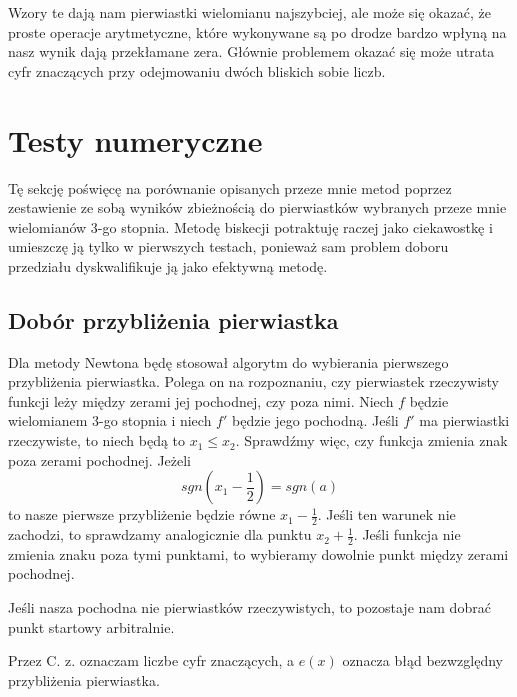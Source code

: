 \documentclass[a4paper]{article}
\begin{document}
    Wzory te dają nam pierwiastki wielomianu najszybciej, ale może się okazać, że proste operacje arytmetyczne,
    które wykonywane są po drodze bardzo wpłyną na nasz wynik dają przekłamane zera. Głównie problemem okazać się 
    może utrata cyfr znaczących przy odejmowaniu dwóch bliskich sobie liczb.

\newpage
\section{Testy numeryczne}
    Tę sekcję poświęcę na porównanie opisanych przeze mnie metod poprzez zestawienie ze sobą wyników zbieżnością
    do pierwiastków wybranych przeze mnie wielomianów 3-go stopnia. Metodę biskecji potraktuję raczej jako ciekawostkę
    i umieszczę ją tylko w pierwszych testach, ponieważ sam problem doboru przedziału dyskwalifikuje ją jako 
    efektywną metodę.

    \vspace{5mm}

    \subsection{Dobór przybliżenia pierwiastka}
    Dla metody Newtona będę stosował algorytm do wybierania pierwszego przybliżenia pierwiastka. Polega 
    on na rozpoznaniu, czy pierwiastek rzeczywisty funkcji leży między zerami jej pochodnej, czy poza nimi. Niech
    $f$ będzie wielomianem 3-go stopnia i niech $f'$ będzie jego pochodną. Jeśli $f'$ ma pierwiastki rzeczywiste,
    to niech będą to $x_1 \leq x_2$. Sprawdźmy więc, czy funkcja zmienia znak poza zerami pochodnej. Jeżeli
    \[
        sgn(x_1 - \frac{1}{2}) = sgn(a)  
    \]
    to nasze pierwsze przybliżenie będzie równe $x_1 - \frac{1}{2}$. Jeśli ten warunek nie zachodzi, to 
    sprawdzamy analogicznie dla punktu $x_2 + \frac{1}{2}$. Jeśli funkcja nie zmienia znaku poza tymi punktami, 
    to wybieramy dowolnie punkt między zerami pochodnej.

    Jeśli nasza pochodna nie pierwiastków rzeczywistych, to pozostaje nam dobrać punkt startowy arbitralnie.

    \vspace{5mm}
        
    Przez C. z. oznaczam liczbe cyfr znaczących, a $e(x)$ oznacza błąd bezwzględny przybliżenia pierwiastka.

    \newpage
\end{document}
